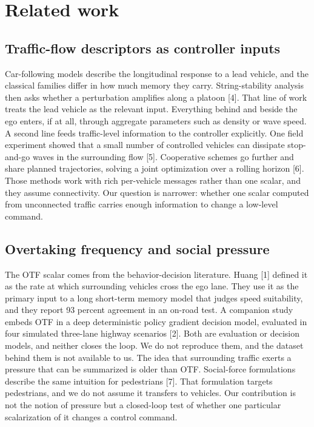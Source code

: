 \documentclass[journal]{IEEEtran}
\begin{document}
\section*{Related work}
\subsection{Traffic-flow descriptors as controller inputs}
Car-following models describe the longitudinal response to a lead vehicle, and the classical families
differ in how much memory they carry. String-stability analysis then asks whether a perturbation
amplifies along a platoon [4]. That line of work treats the lead vehicle as the
relevant input. Everything behind and beside the ego enters, if at all, through aggregate parameters
such as density or wave speed.
A second line feeds traffic-level information to the controller explicitly. One field experiment
showed that a small number of controlled vehicles can dissipate stop-and-go waves in the surrounding
flow [5]. Cooperative schemes go further and share planned trajectories, solving a
joint optimization over a rolling horizon [6]. Those methods work with rich per-vehicle
messages rather than one scalar, and they assume connectivity. Our question is narrower: whether one
scalar computed from unconnected traffic carries enough information to change a low-level command.
\subsection{Overtaking frequency and social pressure}
The OTF scalar comes from the behavior-decision literature. Huang [1] defined it as the rate
at which surrounding vehicles cross the ego lane. They use it as the primary input to a long short-term
memory model that judges speed suitability, and they report 93 percent agreement in an on-road test. A
companion study embeds OTF in a deep deterministic policy gradient decision model, evaluated in four
simulated three-lane highway scenarios [2]. Both are evaluation or decision models, and
neither closes the loop. We do not reproduce them, and the dataset behind them is not available to us.
The idea that surrounding traffic exerts a pressure that can be summarized is older than OTF.
Social-force formulations describe the same intuition for pedestrians [7]. That
formulation targets pedestrians, and we do not assume it transfers to vehicles. Our contribution is
not the notion of pressure but a closed-loop test of whether one particular scalarization of it
changes a control command.
\end{document}
